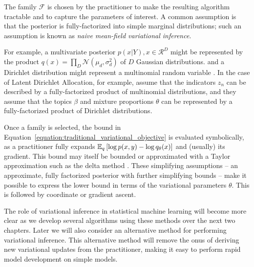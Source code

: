 The family $\mathcal{F}$ is chosen by the practitioner to make the
resulting algorithm tractable and to capture the parameters of
interest. A common assumption is that the posterior is
fully-factorized into simple marginal distributions; such an
assumption is known as \emph{naive mean-field variational inference}.

For example, a multivariate posterior $p(x | Y), x \in \mathcal{R}^D$
might be represented by the product $q(x) = \prod_D \mathcal{N}(\mu_d,
\sigma_d^2)$ of $D$ Gaussian distributions. and a Dirichlet
distribution might represent a multinomial random variable
\cite{bishop:2006}.  In the case of Latent Dirichlet Allocation, for
example, \citet{blei:2003} assume that the indicators $z_n$ can be
described by a fully-factorized product of multinomial distributions,
and they assume that the topics $\beta$ and mixture proportions
$\theta$ can be represented by a fully-factorized product of Dirichlet
distributions.

Once a family is selected, the bound in
Equation~\ref{equation:traditional_variational_objective} is evaluated
symbolically, as a practitioner fully expands $\mathbb{E}_q\left[ \log p(x, y)
  - \log q_\theta(x)\right]$ and (usually) its gradient. This bound may
itself be bounded or approximated with a Taylor approximation such as
the delta method \cite{bickel:2007,braun:2007}. These simplifying
assumptions -- an approximate, fully factorized posterior with further
simplifying bounds -- make it possible to express the lower bound in
terms of the variational parameters $\theta$.  This is followed by
coordinate or gradient ascent.

The role of variational inference in statistical machine learning will
become more clear as we develop several algorithms using these methods
over the next two chapters.  Later we will also consider an
alternative method for performing variational inference.  This
alternative method will remove the onus of deriving new variational
updates from the practitioner, making it easy to perform rapid model
development on simple models.



